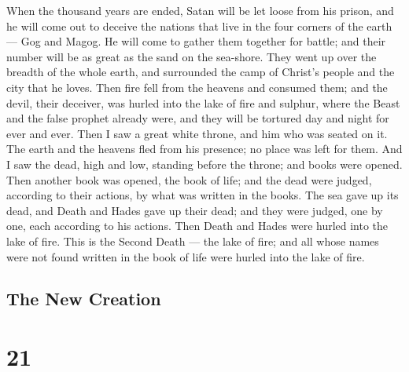  When the thousand years are ended, Satan will be let loose
from his prison,  and he will come out to deceive the
nations that live in the four corners of the earth --- Gog and Magog. He
will come to gather them together for battle; and their number will be
as great as the sand on the sea-shore.  They went up over
the breadth of the whole earth, and surrounded the camp of Christ's
people and the city that he loves. Then fire fell from the heavens and
consumed them;  and the devil, their deceiver, was hurled
into the lake of fire and sulphur, where the Beast and the false prophet
already were, and they will be tortured day and night for ever and ever.
 Then I saw a great white throne, and him who was seated on
it. The earth and the heavens fled from his presence; no place was left
for them.  And I saw the dead, high and low, standing
before the throne; and books were opened. Then another book was opened,
the book of life; and the dead were judged, according to their actions,
by what was written in the books.  The sea gave up its
dead, and Death and Hades gave up their dead; and they were judged, one
by one, each according to his actions.  Then Death and
Hades were hurled into the lake of fire. This is the Second Death ---
the lake of fire;  and all whose names were not found
written in the book of life were hurled into the lake of fire.

\hypertarget{the-new-creation}{%
\subsection{The New Creation}\label{the-new-creation}}

\hypertarget{section-20}{%
\section{21}\label{section-20}}

